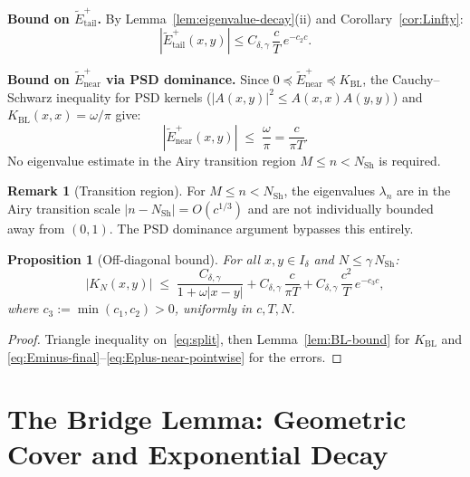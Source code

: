 \documentclass[12pt,a4paper]{article}
\newtheorem{proposition}[theorem]{Proposition}
\theoremstyle{definition}
\newtheorem{remark}[theorem]{Remark}
\newcommand{\NSh}{N_{\mathrm{Sh}}}
\newcommand{\KBL}{K_{\mathrm{BL}}}
\begin{document}
\medskip\noindent
\textbf{Bound on $\widetilde{E}^+_{\mathrm{tail}}$.}
By Lemma~\ref{lem:eigenvalue-decay}(ii) and
Corollary~\ref{cor:Linfty}:
\begin{equation}
\label{eq:Eplus-tail-final}
  |\widetilde{E}^+_{\mathrm{tail}}(x,y)|
  \le C_{\delta,\gamma}\,\frac{c}{T}\,e^{-c_2 c}.
\end{equation}

\medskip\noindent
\textbf{Bound on $\widetilde{E}^+_{\mathrm{near}}$
via PSD dominance.}
Since
$0 \preceq \widetilde{E}^+_{\mathrm{near}}
\preceq \KBL$,
the Cauchy--Schwarz inequality for PSD kernels
($|A(x,y)|^2 \le A(x,x)A(y,y)$) and
$\KBL(x,x) = \omega/\pi$ give:
\begin{equation}
\label{eq:Eplus-near-pointwise}
  |\widetilde{E}^+_{\mathrm{near}}(x,y)|
  \;\le\; \frac{\omega}{\pi} = \frac{c}{\pi T}.
\end{equation}
No eigenvalue estimate in the Airy transition region
$M \le n < \NSh$ is required.

\begin{remark}[Transition region]
For $M \le n < \NSh$, the eigenvalues $\lambda_n$
are in the Airy transition scale $|n-\NSh| = O(c^{1/3})$
and are not individually bounded away from $(0,1)$.
The PSD dominance argument bypasses this entirely.
\end{remark}

\begin{proposition}[Off-diagonal bound]
\label{prop:offdiag}
For all $x,y \in I_\delta$ and $N \le \gamma\,\NSh$:
\begin{equation}
\label{eq:offdiag-final}
  |K_N(x,y)|
  \;\le\;
  \frac{C_{\delta,\gamma}}{1+\omega|x-y|}
  + C_{\delta,\gamma}\,\frac{c}{\pi T}
  + C_{\delta,\gamma}\,\frac{c^2}{T}\,e^{-c_3 c},
\end{equation}
where $c_3 := \min(c_1,c_2) > 0$,
uniformly in $c,T,N$.
\end{proposition}

\begin{proof}
Triangle inequality on~\eqref{eq:split},
then Lemma~\ref{lem:BL-bound} for $\KBL$ and
\eqref{eq:Eminus-final}--\eqref{eq:Eplus-near-pointwise}
for the errors.
\end{proof}

\section{The Bridge Lemma: Geometric Cover and
Exponential Decay}
\label{sec:bridge}
\end{document}
